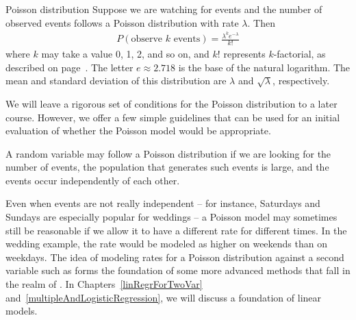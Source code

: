 \begin{onebox}{Poisson distribution}
  Suppose we are watching for events and the number
  of observed events follows a Poisson distribution
  with rate $\lambda$.
  Then
  \begin{align*}
  P(\text{observe $k$ events})
      = \frac{\lambda^{k} e^{-\lambda}}{k!}
  \end{align*}
  where $k$ may take a value 0, 1, 2, and so on,
  and $k!$ represents $k$-factorial, as described on
  page~\pageref{factorialDefinitionInTheBinomialSection}.
  The letter $e\approx2.718$ is the base of the natural
  logarithm.
  The mean and standard deviation of this distribution
  are $\lambda$ and $\sqrt{\lambda}$, respectively.
\end{onebox}

We will leave a rigorous set of conditions for the Poisson distribution to a later course. However, we offer a few simple guidelines that can be used for an initial evaluation of whether the Poisson model would be appropriate.

A random variable may follow a Poisson distribution if we are looking for the number of events, the population that generates such events is large, and the events occur independently of each other.

Even when events are not really independent -- for instance, Saturdays and Sundays are especially popular for weddings -- a Poisson model may sometimes still be reasonable if we allow it to have a different rate for different times. In the wedding example, the rate would be modeled as higher on weekends than on weekdays. The idea of modeling rates for a Poisson distribution against a second variable such as  forms the foundation of some more advanced methods that fall in the realm of . In Chapters~\ref{linRegrForTwoVar} and~\ref{multipleAndLogisticRegression}, we will discuss a foundation of linear models.



